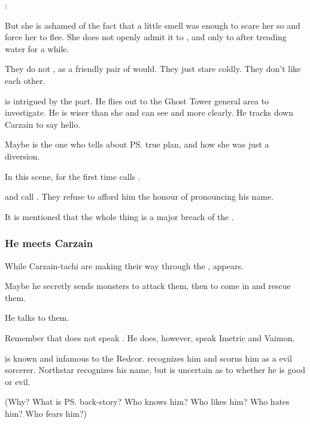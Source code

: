 \begin{garbage}
\Nzessuacrith: 

But she is ashamed of the fact that a little \sathariah{} smell was enough to scare her so and force her to flee. 
She does not openly admit it to \Ishnaruchaefir, and only to \Secherdamon{} after treading water for a while. 

They do not , as a friendly pair of \dragons{} would. 
They just stare coldly. 
They don't like each other. 

\Ishnaruchaefir{} is intrigued by the \sathariah{} part. 
He flies out to the Ghost Tower general area to investigate. 
He is wiser than she and can see \matrices{} and \vertices{} more clearly. 
He tracks down Carzain to say hello. 

Maybe \Ishnaruchaefir{} is the one who tells \Nzessuacrith{} about \ps{\Secherdamon} true plan, and how she was just a diversion. 

In this scene, \Nzessuacrith{} for the first time calls \Ishnaruchaefir{} . 

\Nzessuacrith{} and \Secherdamon{} call \Ishnaruchaefir{} . 
They refuse to afford him the honour of pronouncing his name. 

It is mentioned that the whole thing is a major breach of the \charade. 





\subsubsection{He meets Carzain}
While Carzain-tachi are making their way through the \Wylde{}, \Ishnaruchaefir{} appears. 

Maybe he secretly sends monsters to attack them, then to come in and rescue them. 

He talks to them.

Remember that \Ishnaruchaefir{} does not speak \Velcadian. 
He does, however, speak Imetric and Vaimon. 

\Ishnaruchaefir{} is known and infamous to the Redcor. 
\Esmerel{} recognizes him and scorns him as a evil sorcerer. 
Northstar recognizes his name, but is uncertain as to whether he is good or evil. 

(Why? 
What is \ps{\Ishnaruchaefir} back-story? 
Who knows him? 
Who likes him? 
Who hates him? 
Who fears him?)


\end{garbage}
